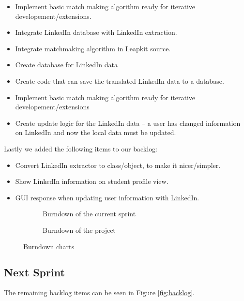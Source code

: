 \begin{itemize}
    \item Implement basic match making algorithm ready for iterative developement/extensions.
    \item Integrate LinkedIn database with LinkedIn extraction. 
    \item Integrate matchmaking algorithm in Leapkit source.
    \item Create database for LinkedIn data
    \item Create code that can save the translated LinkedIn data to a database.
    \item Implement basic match making algorithm ready for iterative developement/extensions 
    \item Create update logic for the LinkedIn data -- a user has changed information on LinkedIn and now the local data must be updated.
\end{itemize}
Lastly we added the following items to our backlog:
\begin{itemize}
    \item Convert LinkedIn extractor to class/object, to make it nicer/simpler.
    \item Show LinkedIn information on student profile view.
    \item GUI response when updating user information with LinkedIn.
\end{itemize}
\begin{figure}[!ht]
    \centering
    \begin{subfigure}[b]{0.5\textwidth}
        \scalebox{.6}{}
        \caption{Burndown of the current sprint}
        \label{fig:burndownSprint}
    \end{subfigure}%
    \begin{subfigure}[b]{0.5\textwidth}
        \scalebox{.7}{}
        \caption{Burndown of the project}
        \label{fig:burndownProject}
    \end{subfigure}
    \caption{Burndown charts}
\end{figure}

\subsection{Next Sprint}
The remaining backlog items can be seen in Figure \ref{fig:backlog}.

